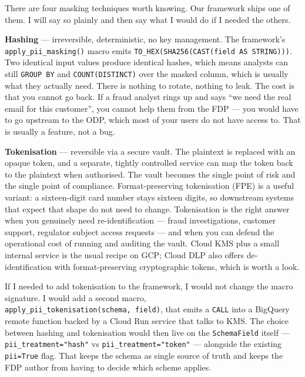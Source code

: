 \documentclass[
  11pt,
  british,
  oneside]{book}
\begin{document}
There are four masking techniques worth knowing. Our framework ships one
of them. I will say so plainly and then say what I would do if I needed
the
others.

\textbf{Hashing} --- irreversible, deterministic, no key management. The
framework's \texttt{apply\_pii\_masking()} macro emits
\texttt{TO\_HEX(SHA256(CAST(field\ AS\ STRING)))}. Two identical input
values produce identical hashes, which means analysts can still
\texttt{GROUP\ BY} and \texttt{COUNT(DISTINCT)} over the masked column,
which is usually what they actually need. There is nothing to rotate,
nothing to leak. The cost is that you cannot go back. If a fraud analyst
rings up and says ``we need the real email for this customer'', you
cannot help them from the FDP --- you would have to go upstream to the
ODP, which most of your users do not have access to. That is usually a
feature, not a bug.

\textbf{Tokenisation} --- reversible via a secure vault. The plaintext
is replaced with an opaque token, and a separate, tightly controlled
service can map the token back to the plaintext when authorised. The
vault becomes the single point of risk and the single point of
compliance. Format-preserving tokenisation (FPE) is a useful variant: a
sixteen-digit card number stays sixteen digits, so downstream systems
that expect that shape do not need to change. Tokenisation is the right
answer when you genuinely need re-identification --- fraud
investigations, customer support, regulator subject access requests ---
and when you can defend the operational cost of running and auditing the
vault. Cloud KMS plus a small internal service is the usual recipe on
GCP; Cloud DLP also offers de-identification with format-preserving
cryptographic tokens, which is worth a
look.

If I needed to add tokenisation to the framework, I would not change the
macro signature. I would add a second macro,
\texttt{apply\_pii\_tokenisation(schema,\ field)}, that emits a
\texttt{CALL} into a BigQuery remote function backed by a Cloud Run
service that talks to KMS. The choice between hashing and tokenisation
would then live on the \texttt{SchemaField} itself ---
\texttt{pii\_treatment="hash"} vs \texttt{pii\_treatment="token"} ---
alongside the existing \texttt{pii=True} flag. That keeps the schema as
single source of truth and keeps the FDP author from having to decide
which scheme applies.
\end{document}
